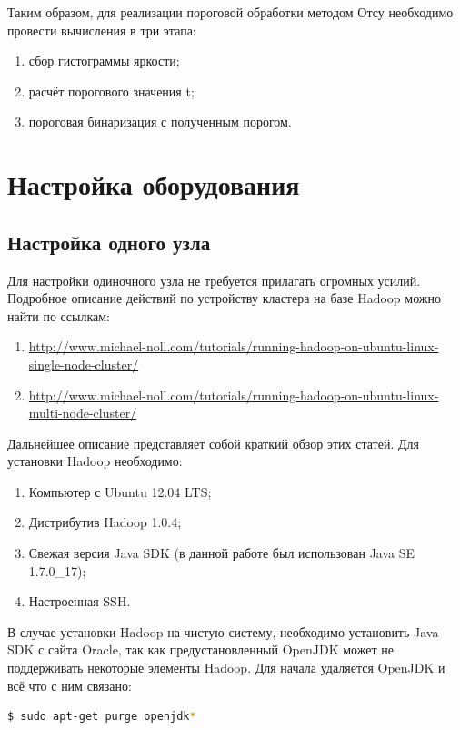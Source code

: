 \documentclass[12pt,a4paper]{extarticle} %
\begin{document}
    Таким образом, для реализации пороговой обработки методом Отсу необходимо провести вычисления в три этапа:
\begin{enumerate}
    \item сбор гистограммы яркости;\\
    \item расчёт порогового значения t;\\
    \item пороговая бинаризация с полученным порогом.
\end{enumerate}

\newpage
\section{Настройка оборудования} \label{sec:TuningCluster}
\subsection{Настройка одного узла}

    Для настройки одиночного узла не требуется прилагать огромных усилий. Подробное описание действий по устройству кластера на базе Hadoop можно найти по ссылкам:
\begin{enumerate}
    \item[] \href{http://www.michael-noll.com/tutorials/running-hadoop-on-ubuntu-linux-single-node-cluster/}{http://www.michael-noll.com/tutorials/running-hadoop-on-ubuntu-linux-single-node-cluster/}
    \item[] \href{http://www.michael-noll.com/tutorials/running-hadoop-on-ubuntu-linux-multi-node-cluster/}{http://www.michael-noll.com/tutorials/running-hadoop-on-ubuntu-linux-multi-node-cluster/}
\end{enumerate}

    Дальнейшее описание представляет собой краткий обзор этих статей. Для установки Hadoop необходимо:
\begin{enumerate}
    \item Компьютер с Ubuntu 12.04 LTS;
    \item Дистрибутив Hadoop 1.0.4;
    \item Свежая версия Java SDK (в данной работе был использован Java SE 1.7.0\_17);
    \item Настроенная SSH.
\end{enumerate}

    В случае установки Hadoop на чистую систему, необходимо установить Java SDK с сайта Oracle, так как предустановленный OpenJDK может не поддерживать некоторые элементы Hadoop.
\noindent Для начала удаляется OpenJDK и всё что с ним связано:
\begin{lstlisting}[language=sh]
    $ sudo apt-get purge openjdk*
\end{lstlisting}
\end{document}
